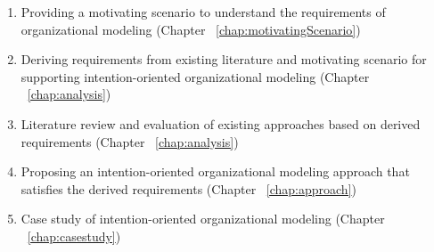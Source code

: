 \begin{enumerate}
	\item Providing a motivating scenario to understand the requirements of organizational modeling (Chapter ~\ref{chap:motivatingScenario})
 	\item Deriving requirements from existing literature and motivating scenario for supporting intention-oriented organizational modeling (Chapter  ~\ref{chap:analysis})
 	\item Literature review and evaluation of existing approaches based on derived requirements (Chapter ~\ref{chap:analysis})
 	\item Proposing an intention-oriented organizational modeling approach that satisfies the derived requirements (Chapter ~\ref{chap:approach})
 	\item Case study of intention-oriented organizational modeling (Chapter ~\ref{chap:casestudy})
\end{enumerate}
 

